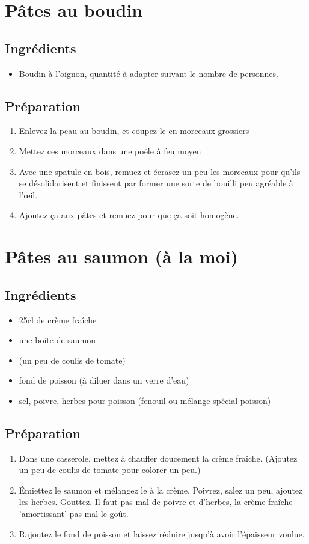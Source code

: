 \newpage
\section{Pâtes au boudin}
\subsection*{Ingrédients}
\begin{itemize}
\item Boudin à l'oignon, quantité à adapter suivant le nombre de personnes.
\end{itemize}

\subsection*{Préparation}
\begin{enumerate}
\item Enlevez la peau au boudin, et coupez le en morceaux grossiers
\item Mettez ces morceaux dans une poële à feu moyen
\item Avec une spatule en bois, remuez et écrasez un peu les morceaux pour qu'ils se désolidarisent et finissent par former une sorte de bouilli peu agréable à l'\oe il.
\item Ajoutez ça aux pâtes et remuez pour que ça soit homogène.
\end{enumerate}

\newpage
\section{Pâtes au saumon (à la moi)}
\subsection*{Ingrédients}
\begin{itemize}
\item 25cl de crème fraîche
\item une boite de saumon
\item (un peu de coulis de tomate)
\item fond de poisson (à diluer dans un verre d'eau)
\item sel, poivre, herbes pour poisson (fenouil ou mélange spécial poisson)
\end{itemize}

\subsection*{Préparation}
\begin{enumerate}
\item Dans une casserole, mettez à chauffer doucement la crème fraîche. (Ajoutez un peu de coulis de tomate pour colorer un peu.)
\item Émiettez le saumon et mélangez le à la crème. Poivrez, salez un peu, ajoutez les herbes. Gouttez. Il faut pas mal de poivre et d'herbes, la crème fraîche 'amortissant' pas mal le goût.
\item Rajoutez le fond de poisson et laissez réduire jusqu'à avoir l'épaisseur voulue.
\end{enumerate}

